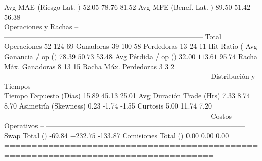   Avg MAE (Riesgo Lat. $)     $          52.05  $          78.76  $          81.52
  Avg MFE (Benef. Lat. $)     $          89.50  $          51.42  $          56.38
------------------------------------------------------------------------------------
  -- Operaciones y Rachas --
------------------------------------------------------------------------------------
  Total Operaciones                         52               124                69
  Ganadoras                                 39               100                58
  Perdedoras                                13                24                11
  Hit Ratio (%
  Avg Ganancia / op ($)       $          78.39  $          50.73  $          53.48
  Avg Pérdida / op ($)        $          32.00  $         113.61  $          95.74
  Racha Máx. Ganadoras                       8                13                15
  Racha Máx. Perdedoras                      3                 3                 2
------------------------------------------------------------------------------------
  -- Distribución y Tiempos --
------------------------------------------------------------------------------------
  Tiempo Expuesto (Días)                 15.89             45.13             25.01
  Avg Duración Trade (Hrs)                7.33              8.74              8.70
  Asimetría (Skewness)                    0.23             -1.74             -1.55
  Curtosis                                5.00             11.74              7.20
------------------------------------------------------------------------------------
  -- Costos Operativos --
------------------------------------------------------------------------------------
  Swap Total ($)              $         -69.84  $        -232.75  $        -133.87
  Comisiones Total ($)        $           0.00  $           0.00  $           0.00
====================================================================================

